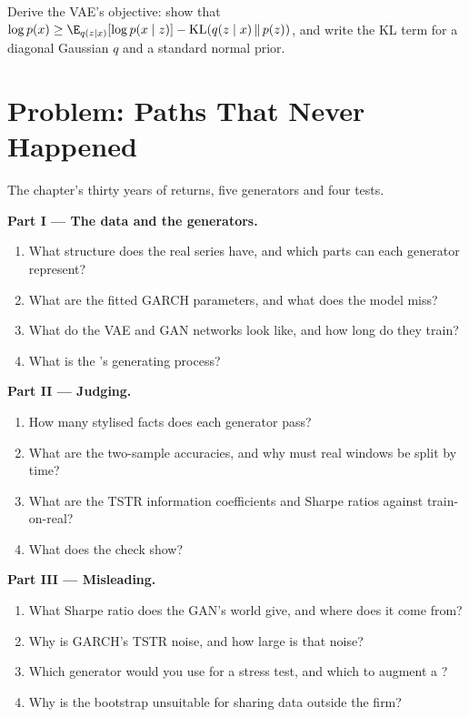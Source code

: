 \begin{exercise}[$\star\star\star$]\label{exo:ml:generative-models-and-synthetic-data:8}
Derive the VAE's objective: show that $\log p(x)\ge\E_{q(z\mid x)}[\log p(x\mid z)] - \mathrm{KL}(q(z\mid x)\,\|\,p(z))$, and
write the KL term for a diagonal Gaussian $q$ and a standard normal prior.
\end{exercise}

\section{Problem: Paths That Never Happened}

\begin{problem}\label{pb:ml:generative-models-and-synthetic-data:1}
The chapter's thirty years of returns, five generators and four tests.

\medskip\noindent\textbf{Part I --- The data and the generators.}
\begin{enumerate}
\item What structure does the real series have, and which parts can each generator represent?
\item What are the fitted GARCH parameters, and what does the model miss?
\item What do the VAE and GAN networks look like, and how long do they train?
\item What is the 's generating process?
\end{enumerate}

\medskip\noindent\textbf{Part II --- Judging.}
\begin{enumerate}[resume]
\item How many stylised facts does each generator pass?
\item What are the two-sample accuracies, and why must real windows be split by time?
\item What are the TSTR information coefficients and Sharpe ratios against train-on-real?
\item What does the  check show?
\end{enumerate}

\medskip\noindent\textbf{Part III --- Misleading.}
\begin{enumerate}[resume]
\item What Sharpe ratio does the GAN's world give, and where does it come from?
\item Why is GARCH's TSTR noise, and how large is that noise?
\item Which generator would you use for a stress test, and which to augment a ?
\item Why is the bootstrap unsuitable for sharing data outside the firm?
\end{enumerate}


\end{problem}
